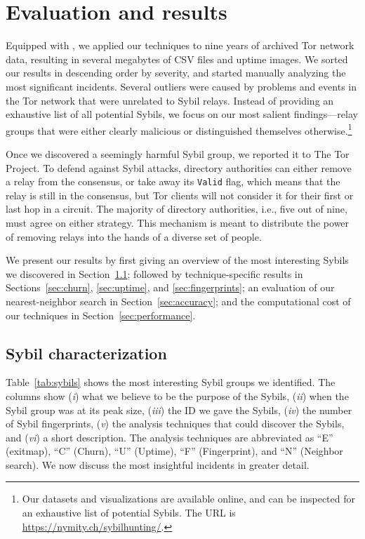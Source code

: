 \section{Evaluation and results}
\label{sec:results}
Equipped with \sys, we applied our techniques to nine years of archived Tor
network data, resulting in several megabytes of CSV files and uptime images.  We
sorted our results in descending order by severity, and started manually
analyzing the most significant incidents.  Several outliers were caused by
problems and events in the Tor network that were unrelated to Sybil relays.
Instead of providing an exhaustive list of all potential Sybils, we focus on our
most salient findings---relay groups that were either clearly malicious or
distinguished themselves otherwise.\footnote{Our datasets and visualizations are
available online, and can be inspected for an exhaustive list of potential
Sybils.  The URL is \url{https://nymity.ch/sybilhunting/}.}

Once we discovered a seemingly harmful Sybil group, we reported it to The Tor
Project.  To defend against Sybil attacks, directory authorities can either
remove a relay from the consensus, or take away its \texttt{Valid} flag, which
means that the relay is still in the consensus, but Tor clients will not
consider it for their first or last hop in a circuit.  The majority of directory
authorities, i.e., five out of nine, must agree on either strategy.  This
mechanism is meant to distribute the power of removing relays into the hands of
a diverse set of people.

We present our results by first giving an overview of the most interesting
Sybils we discovered in Section~\ref{sec:sybil_groups}; followed by
technique-specific results in Sections~\ref{sec:churn}, \ref{sec:uptime}, and
\ref{sec:fingerprints}; an evaluation of our nearest-neighbor search in
Section~\ref{sec:accuracy}; and the computational cost of our techniques in
Section~\ref{sec:performance}.

\subsection{Sybil characterization}
\label{sec:sybil_groups}
Table~\ref{tab:sybils} shows the most interesting Sybil groups we identified.
The columns show (\emph{i}) what we believe to be the purpose of the Sybils,
(\emph{ii}) when the Sybil group was at its peak size, (\emph{iii}) the ID we
gave the Sybils, (\emph{iv}) the number of Sybil fingerprints, (\emph{v}) the
analysis techniques that could discover the Sybils, and (\emph{vi}) a short
description.  The analysis techniques are abbreviated as ``E'' (exitmap), ``C''
(Churn), ``U'' (Uptime), ``F'' (Fingerprint), and ``N'' (Neighbor search).  We
now discuss the most insightful incidents in greater detail.



